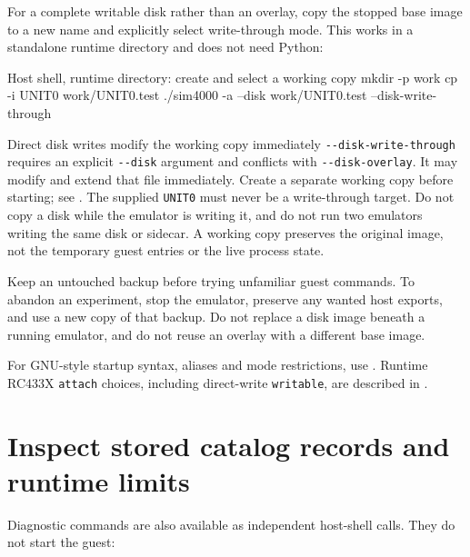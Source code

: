For a complete writable disk rather than an overlay, copy the stopped base
image to a new name and explicitly select write-through mode. This works
in a standalone runtime directory and does not need Python:

\begin{commandexample}[language=sh]{Host shell, runtime directory: create and select a working copy}
mkdir -p work
cp -i UNIT0 work/UNIT0.test
./sim4000 -a --disk work/UNIT0.test --disk-write-through
\end{commandexample}

\begin{operationnote}{Direct disk writes modify the working copy immediately}
\passthrough{\lstinline!--disk-write-through!} requires an explicit \passthrough{\lstinline!--disk!} argument and conflicts with \passthrough{\lstinline!--disk-overlay!}. It may modify and extend that file immediately. Create a separate working copy before starting; see . The supplied \passthrough{\lstinline!UNIT0!} must never be a write-through target. Do not copy a disk while the emulator is writing it, and do not run two emulators writing the same disk or sidecar. A working copy preserves the original image, not the temporary guest entries or the live process state.

Keep an untouched backup before trying unfamiliar guest commands. To abandon
an experiment, stop the emulator, preserve any wanted host exports, and use a
new copy of that backup. Do not replace a disk image beneath a running
emulator, and do not reuse an overlay with a different base image.
\end{operationnote}

For GNU-style startup syntax, aliases and mode restrictions, use . Runtime RC433X \passthrough{\lstinline!attach!} choices, including direct-write \passthrough{\lstinline!writable!}, are described in .

\section{Inspect stored catalog records and runtime limits}\label{inspect-stored-catalog-records-and-runtime-limits}

Diagnostic commands are also available as independent host-shell calls. They do not start the guest:

